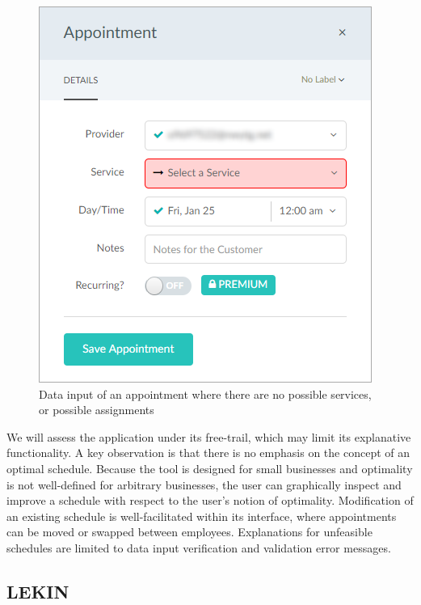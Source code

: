 \begin{figure}[H]
	\begin{center}
		\includegraphics[scale=0.6]{figures/setmore_no_service.png}
	\end{center}
	\caption{Data input of an appointment where there are no possible services, or possible assignments}
\end{figure}

We will assess the application under its free-trail, which may limit its explanative functionality. A key observation is that there is no emphasis on the concept of an optimal schedule. Because the tool is designed for small businesses and optimality is not well-defined for arbitrary businesses, the user can graphically inspect and improve a schedule with respect to the user's notion of optimality. Modification of an existing schedule is well-facilitated within its interface, where appointments can be moved or swapped between employees. Explanations for unfeasible schedules are limited to data input verification and validation error messages.

\subsection{LEKIN}

